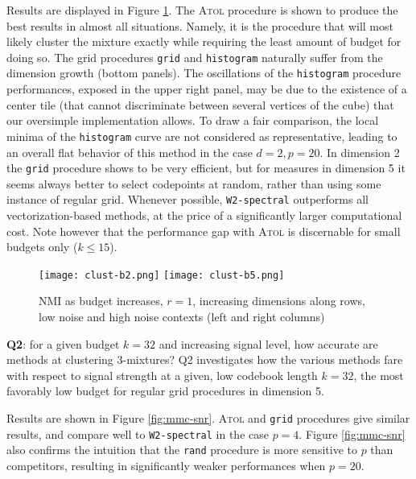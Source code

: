 \documentclass[noinfoline,preprint]{article}
\renewcommand{\1}{\mathds 1}
\begin{document}
Results are displayed in Figure \ref{fig:mmc-budget}. The \textsc{Atol} procedure is shown to produce the best results in almost all situations. Namely, it is the procedure that will most likely cluster the mixture exactly while requiring the least amount of budget for doing so. The grid procedures \texttt{grid} and \texttt{histogram} naturally suffer from the dimension growth (bottom panels). The oscillations of the \texttt{histogram} procedure performances, exposed in the upper right panel,  may be due to the existence of a center tile (that cannot discriminate between several vertices of the cube) that our oversimple implementation allows. To draw a fair comparison, the local minima of the \texttt{histogram} curve are not considered as representative, leading to an overall flat behavior of this method in the case $d=2, p=20$. In dimension 2 the \texttt{grid} procedure shows to be very efficient, but for measures in dimension 5 it seems always better to select codepoints at random, rather than using some instance of regular grid. Whenever possible, \texttt{W2-spectral} outperforms all vectorization-based methods, at the price of a significantly larger computational cost. Note however that the performance gap with \textsc{Atol} is discernable for small budgets only ($k \leq 15$).

\begin{figure}[h!]
	\centering
	\texttt{[image: clust-b2.png]}
	\texttt{[image: clust-b5.png]}
	\caption{NMI as budget increases, $r=1$, increasing dimensions along rows, low noise and high noise contexts (left and right columns)}
	\label{fig:mmc-budget}
\end{figure}

\textbf{Q2}: for a given budget $k=32$ and increasing signal level, how accurate are methods at clustering 3-mixtures? Q2 investigates how the various methods fare with respect to signal strength at a given, low codebook length $k=32$, the most favorably low budget for regular grid procedures in dimension 5.

Results are shown in Figure \ref{fig:mmc-snr}. \textsc{Atol} and \texttt{grid} procedures give similar results, and compare well to \texttt{W2-spectral} in the case $p=4$. Figure \ref{fig:mmc-snr} also confirms the intuition that the \texttt{rand} procedure is more sensitive to $p$ than competitors, resulting in significantly weaker performances when $p=20$.
\end{document}
